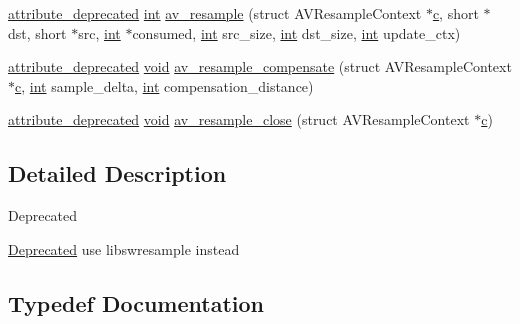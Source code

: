 \begin{DoxyCompactItemize}
\item 
\hyperlink{attributes_8h_aa6d076561d3a9eea4729ee632652de02}{attribute\+\_\+deprecated} \hyperlink{xmltok_8h_a5a0d4a5641ce434f1d23533f2b2e6653}{int} \hyperlink{group__lavc__resample_gaced5571eafa8e23a25b96e1755f8f65c}{av\+\_\+resample} (struct A\+V\+Resample\+Context $\ast$\hyperlink{rfft2d_test_m_l_8m_ae0323a9039add2978bf5b49550572c7c}{c}, short $\ast$dst, short $\ast$src, \hyperlink{xmltok_8h_a5a0d4a5641ce434f1d23533f2b2e6653}{int} $\ast$consumed, \hyperlink{xmltok_8h_a5a0d4a5641ce434f1d23533f2b2e6653}{int} src\+\_\+size, \hyperlink{xmltok_8h_a5a0d4a5641ce434f1d23533f2b2e6653}{int} dst\+\_\+size, \hyperlink{xmltok_8h_a5a0d4a5641ce434f1d23533f2b2e6653}{int} update\+\_\+ctx)
\item 
\hyperlink{attributes_8h_aa6d076561d3a9eea4729ee632652de02}{attribute\+\_\+deprecated} \hyperlink{sound_8c_ae35f5844602719cf66324f4de2a658b3}{void} \hyperlink{group__lavc__resample_gadf6acc7cdbbf2fe8d6a7990a22662c0b}{av\+\_\+resample\+\_\+compensate} (struct A\+V\+Resample\+Context $\ast$\hyperlink{rfft2d_test_m_l_8m_ae0323a9039add2978bf5b49550572c7c}{c}, \hyperlink{xmltok_8h_a5a0d4a5641ce434f1d23533f2b2e6653}{int} sample\+\_\+delta, \hyperlink{xmltok_8h_a5a0d4a5641ce434f1d23533f2b2e6653}{int} compensation\+\_\+distance)
\item 
\hyperlink{attributes_8h_aa6d076561d3a9eea4729ee632652de02}{attribute\+\_\+deprecated} \hyperlink{sound_8c_ae35f5844602719cf66324f4de2a658b3}{void} \hyperlink{group__lavc__resample_ga2901688d58c5a64b97436288b301ad18}{av\+\_\+resample\+\_\+close} (struct A\+V\+Resample\+Context $\ast$\hyperlink{rfft2d_test_m_l_8m_ae0323a9039add2978bf5b49550572c7c}{c})
\end{DoxyCompactItemize}


\subsection{Detailed Description}
\begin{DoxyRefDesc}{Deprecated}
\item[\hyperlink{deprecated__deprecated000010}{Deprecated}]use libswresample instead\end{DoxyRefDesc}


\subsection{Typedef Documentation}
